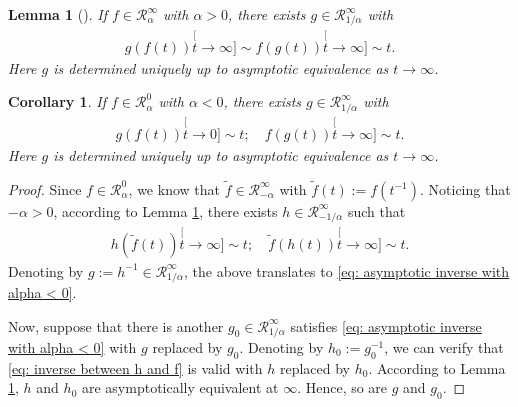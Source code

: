 \documentclass[12pt,a4paper]{amsart}
\newtheorem{lem}[thm]{Lemma}
\newtheorem{cro}[thm]{Corollary}
\theoremstyle{definition}
\numberwithin{equation}{section}
\begin{document}
\begin{lem}[{\cite[Theorem 1.5.12]{BinghamGoldieTeugels1989Regular}}] \label{lem: regularly variation and inverse}
	If $f \in \mathcal R_\alpha^\infty$ with $\alpha > 0$, there exists $g \in \mathcal R^\infty_{1/\alpha}$ with
  \begin{align}
    g(f(t))
    \stackrel[t\to \infty]{}{\sim}
    f(g(t))
    \stackrel[t\to \infty]{}{\sim}
    t.
  \end{align}
	Here $g$ is determined uniquely up to asymptotic equivalence as $t\to \infty$.
\end{lem}
\begin{cro} \label{cro: regularly varing and inverse with alpha < 0}
	If $f \in \mathcal R_\alpha^0$ with $\alpha < 0$, there exists $g \in \mathcal R^\infty_{1/\alpha}$ with
  \begin{align} \label{eq: asymptotic inverse with alpha < 0}
    g(f(t))
    \stackrel[t\to 0]{}{\sim}
    t;
    \quad
    f(g(t))
    \stackrel[t\to \infty]{}{\sim}
    t.
  \end{align}
	Here $g$ is determined uniquely up to asymptotic equivalence as $t\to \infty$.
\end{cro}
\begin{proof}
	Since $f \in \mathcal R_\alpha^0$, we know that $\tilde f \in \mathcal R_{-\alpha}^\infty$ with $\tilde f(t):= f(t^{-1})$.
	Noticing that $-\alpha > 0$, according to Lemma \ref{lem: regularly variation and inverse}, there exists $h \in \mathcal R_{-1/\alpha}^{\infty}$ such that
  \begin{align} \label{eq: inverse between h and f}
    h(\tilde f(t))
    \stackrel[t\to \infty]{}{\sim}
    t;
    \quad
    \tilde f(h(t))
    \stackrel[t\to \infty]{}{\sim}
    t.
  \end{align}
	Denoting by $g := h^{-1} \in \mathcal R_{1/\alpha}^\infty$, the above translates to \eqref{eq: asymptotic inverse with alpha < 0}.

	Now, suppose that there is another $g_0 \in \mathcal R_{1/\alpha}^\infty$ satisfies \eqref{eq: asymptotic inverse with alpha < 0} with $g$ replaced by $g_0$.
	Denoting by $h_0 := g_0^{-1}$, we can verify that \eqref{eq: inverse between h and f} is valid with $h$ replaced by $h_0$.
	According to Lemma \ref{lem: regularly variation and inverse}, 
	$h$ and $h_0$ are asymptotically equivalent at $\infty$.
	Hence, so are $g$ and $g_0$.
\end{proof}
\end{document}
